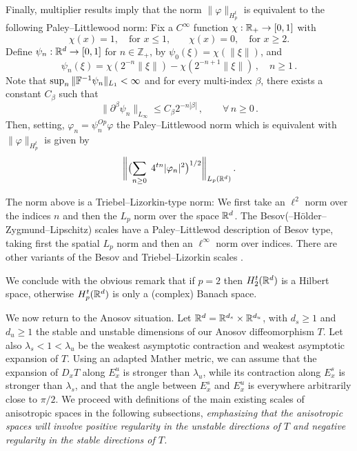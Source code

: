 \documentclass[10pt,twoside]{amsart}
\begin{document}
Finally, multiplier results imply that the norm $\|\varphi\|_{H^t_p}$ is equivalent
to the following Paley--Littlewood norm: 
Fix a $C^\infty$ function $\chi:\mathbb{R}_+\to [0,1]$ with
\begin{equation}\label{defchi}
\chi(x)=
1, \quad \mbox{for $x\le 1$,}\qquad
\chi(x)=0, \quad \mbox{for $x\ge 2$.}
\end{equation} 
Define $\psi_n:\mathbb{R}^d\to [0,1]$ for $n\in \mathbb Z_+$, by
$\psi_0(\xi)=\chi(\|\xi\|)$, and
\begin{equation}\label{2.49}
\psi_n(\xi)=\chi(2^{-n}\|\xi\|)-\chi(2^{-n+1}\|\xi\|) \, , 
\quad n\ge 1 \,  .
\end{equation}
Note that $\sup_n \|\mathbb{F}^{-1} \psi_n\|_{L_1}<\infty$ and for every multi-index $\beta$, there exists a constant $C_\beta$ such that
\begin{equation}\label{betagood}
\|\partial^\beta \psi_n\|_{L_\infty} \le C_\beta 2^{-n|\beta|}\, ,
\qquad  \forall\,  n\ge 0\, .
\end{equation}
Then, setting, $\varphi_n=\psi_n^{Op} \varphi$ 
the Paley--Littlewood norm which is equivalent \cite[\S 2.1]{RS} with $\|\varphi\|_{H^t_p}$ is given by 
$$ 
\biggl \|\bigl (\sum_{n\ge 0} \; 4^{tn} |\varphi_n |^2\bigr )^{1/2}\biggr  \|_{L_p(\mathbb{R}^d)}
\, .$$

The norm above is a Triebel--Lizorkin-type norm: We first take an $\ell^2$ norm over the indices
$n$ and then the $L_p$
norm over the space $\mathbb{R}^d$. 
The Besov(--H\"older--Zygmund--Lipschitz) scales  have a Paley--Littlewod description
of Besov type, taking first the spatial $L_p$ norm and then an $\ell^\infty$ norm over indices.
There are other variants of the Besov and Triebel--Lizorkin scales \cite{RS}.

We conclude with the obvious remark that
if $p=2$ then $H^t_2(\mathbb{R}^d)$ is a Hilbert space, otherwise
$H^t_p(\mathbb{R}^d)$  is only a (complex) Banach space.

\medskip

We now return to the Anosov situation. Let $\mathbb{R}^d= \mathbb{R}^{d_s}\times \mathbb{R}^{d_u}$, with
$d_s\ge 1$ and $d_u \ge 1$ the  stable and unstable
dimensions of our Anosov diffeomorphism $T$. Let also
$\lambda_s<1<\lambda_u$
be the weakest asymptotic contraction and weakest asymptotic expansion of $T$.
Using an adapted Mather metric, we can assume that 
 the expansion of $D_x T$ along $E^u_x$
 is stronger than $\lambda_u$, while its contraction
along $E^s_x$ is stronger than $\lambda_s$, and that  the angle
between $E^s_x$ and $E^u_x$  is everywhere arbitrarily
close to $\pi/2$. 
We proceed with definitions of the main existing scales of anisotropic
spaces in the following subsections,
{\it emphasizing that  the anisotropic spaces will involve positive regularity in the
unstable directions of $T$ and negative regularity in the stable directions
of $T$.}
\end{document}
